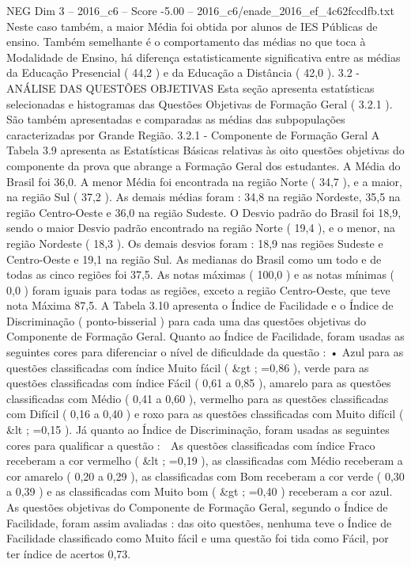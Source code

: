 \begin{textsample}{NEG Dim 3 – 2016\_c6 – Score -5.00 – 2016\_c6/enade\_2016\_ef\_4c62fccdfb.txt}
Neste caso também, a maior Média foi obtida por alunos de IES Públicas de ensino.
Também semelhante é o comportamento das médias no que toca à Modalidade de Ensino, há diferença estatisticamente significativa entre as médias da Educação Presencial ( 44,2 ) e da Educação a Distância ( 42,0 ). 3.2 - ANÁLISE DAS QUESTÕES OBJETIVAS Esta seção apresenta estatísticas selecionadas e histogramas das Questões Objetivas de Formação Geral ( 3.2.1 ).
São também apresentadas e comparadas as médias das subpopulações caracterizadas por Grande Região. 3.2.1 - Componente de Formação Geral A Tabela 3.9 apresenta as Estatísticas Básicas relativas às oito questões objetivas do componente da prova que abrange a Formação Geral dos estudantes.
A Média do Brasil foi 36,0.
A menor Média foi encontrada na região Norte ( 34,7 ), e a maior, na região Sul ( 37,2 ).
As demais médias foram : 34,8 na região Nordeste, 35,5 na região Centro-Oeste e 36,0 na região Sudeste.
O Desvio padrão do Brasil foi 18,9, sendo o maior Desvio padrão encontrado na região Norte ( 19,4 ), e o menor, na região Nordeste ( 18,3 ).
Os demais desvios foram : 18,9 nas regiões Sudeste e Centro-Oeste e 19,1 na região Sul.
As medianas do Brasil como um todo e de todas as cinco regiões foi 37,5.
As notas máximas ( 100,0 ) e as notas mínimas ( 0,0 ) foram iguais para todas as regiões, exceto a região Centro-Oeste, que teve nota Máxima 87,5.
A Tabela 3.10 apresenta o Índice de Facilidade e o Índice de Discriminação ( ponto-bisserial ) para cada uma das questões objetivas do Componente de Formação Geral.
Quanto ao Índice de Facilidade, foram usadas as seguintes cores para diferenciar o nível de dificuldade da questão : • Azul para as questões classificadas com índice Muito fácil ( \&gt ; =0,86 ), verde para as questões classificadas com índice Fácil ( 0,61 a 0,85 ), amarelo para as questões classificadas com Médio ( 0,41 a 0,60 ), vermelho para as questões classificadas com Difícil ( 0,16 a 0,40 ) e roxo para as questões classificadas com Muito difícil ( \&lt ; =0,15 ).
Já quanto ao Índice de Discriminação, foram usadas as seguintes cores para qualificar a questão :  As questões classificadas com índice Fraco receberam a cor vermelho ( \&lt ; =0,19 ), as classificadas com Médio receberam a cor amarelo ( 0,20 a 0,29 ), as classificadas com Bom receberam a cor verde ( 0,30 a 0,39 ) e as classificadas com Muito bom ( \&gt ; =0,40 ) receberam a cor azul.
As questões objetivas do Componente de Formação Geral, segundo o Índice de Facilidade, foram assim avaliadas : das oito questões, nenhuma teve o Índice de Facilidade classificado como Muito fácil e uma questão foi tida como Fácil, por ter índice de acertos 0,73.

\end{textsample}
